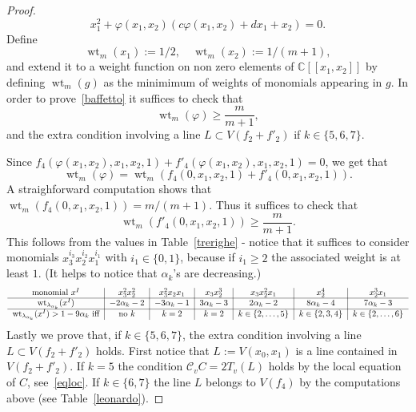 \documentclass[11pt]{amsart}
\numberwithin{equation}{section}
\theoremstyle{plain}
\theoremstyle{remark}
\theoremstyle{definition}
\newcommand{\CC}{{\mathbb C}}
\newcommand{\cC}{{\mathscr C}}
\DeclareMathOperator{\weight}{wt}
\begin{document}
\begin{proof}
\begin{equation}
%
x_1^2+\varphi(x_1,x_2)(c\varphi(x_1,x_2)+dx_1+x_2)=0.
%
\end{equation}
%
Define 
%
\begin{equation}
%
\weight_m(x_1):=1/2,\quad \weight_m(x_2):=1/(m+1),
%
\end{equation}
%
 and extend it to a weight function on non zero elements of $\CC[[x_1,x_2]]$ by defining $\weight_m(g)$ as the minimimum of weights of monomials appearing in $g$. In order to prove~\eqref{baffetto} it suffices to check that
%
\begin{equation}
%
\weight_m(\varphi)\ge\frac{m}{m+1},
%
\end{equation}
%
and the extra condition involving a line $L\subset V(f_2+f'_2)$ if $k\in\{5,6,7\}$.

Since $f_4(\varphi(x_1,x_2),x_1,x_2,1)+f'_4(\varphi(x_1,x_2),x_1,x_2,1)=0$, we get that 
%
\begin{equation}
%
\weight_m(\varphi)=\weight_m(f_4(0,x_1,x_2,1)+f'_4(0,x_1,x_2,1)).
%
\end{equation}
%
A straighforward computation shows that $\weight_m(f_4(0,x_1,x_2,1))= m/(m+1)$. Thus it suffices to check that
%
\begin{equation}
%
\weight_m(f'_4(0,x_1,x_2,1))\ge\frac{m}{m+1}.
%
\end{equation}
%
This follows from the values in Table~\eqref{trerighe} - notice that it suffices to consider monomials $x_3^{i_3}x_2^{i_2}x_1^{i_1}$ with $i_1\in\{0,1\}$, because if $i_1\ge 2$  the  associated weight  is at least $1$. (It helps to notice that $\alpha_k$'s are decreasing.)
%
\begin{equation}\label{trerighe}
%
\begin{tabular}{c|c|c|c|c|c|c }
%
monomial  $x^{I}$ &  $x_3^2x_2^2$ & $x_3^2x_2 x_1$ & $x_3 x_2^3$ &  $x_3 x_2^2 x_1$ &     $x_2^4$ &   $x_2^3 x_1$  \\
%
\hline
%
$\weight_{\lambda_{\alpha_k}}(x^I)$  & $-2\alpha_k-2$ & $-3\alpha_k-1$  & $3\alpha_k-3$  &  $2\alpha_k-2$  &   $8\alpha_k-4$  & $7\alpha_k-3$  \\
%
\hline
%
$\weight_{\lambda_{\alpha_k}}(x^I)>1-9\alpha_k$ iff  & no $k$ & $k=2$  &  $k=2$  & $k\in\{2,\ldots,5\}$  &   $k\in\{2,3,4\}$  & $k\in\{2,\ldots,6\}$  \\
%
\end{tabular}
%
\end{equation}
%
Lastly we prove that,  if $k\in\{5,6,7\}$, the extra condition involving a line $L\subset V(f_2+f'_2)$ holds. First notice that $L:=V(x_0,x_1)$ is a line contained in $V(f_2+f'_2)$.  If $k=5$ the condition $\cC_v C=2T_v(L)$ holds by the local equation of $C$, see~\eqref{eqloc}.  If $k\in\{6,7\}$ the line $L$ belongs to $V(f_4)$ by the computations above (see Table~\ref{leonardo}). 




\end{proof}
\end{document}
